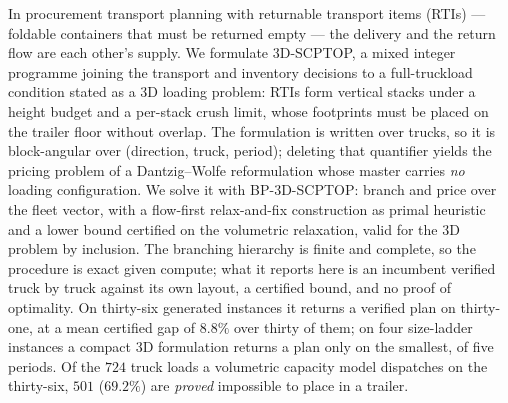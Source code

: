 In procurement transport planning with returnable transport items
(RTIs) --- foldable containers that must be returned empty --- the
delivery and the return flow are each other's supply. We formulate
3D-SCPTOP, a mixed integer programme joining the transport and
inventory decisions to a full-truckload condition stated as a 3D
loading problem: RTIs form vertical stacks under a height budget and a
per-stack crush limit, whose footprints must be placed on the trailer
floor without overlap. The formulation is written over trucks, so it
is block-angular over (direction, truck, period); deleting that
quantifier yields the pricing problem of a Dantzig--Wolfe
reformulation whose master carries \emph{no} loading configuration. We solve it with BP-3D-SCPTOP: branch and price over
the fleet vector, with a flow-first relax-and-fix construction as
primal heuristic and a lower bound certified on the volumetric
relaxation, valid for the 3D problem by inclusion. The branching
hierarchy is finite and complete, so the procedure is exact given
compute; what it reports here is an incumbent verified truck by truck
against its own layout, a certified bound, and no proof of optimality.
On thirty-six generated instances
it returns a verified plan on thirty-one, at a mean certified gap of
$8.8\%$ over thirty of them; on four size-ladder instances a compact 3D formulation
returns a plan only on the smallest, of five periods. Of the $724$
truck loads a volumetric capacity model dispatches on the thirty-six,
$501$ ($69.2\%$) are \emph{proved} impossible to place in a trailer.

